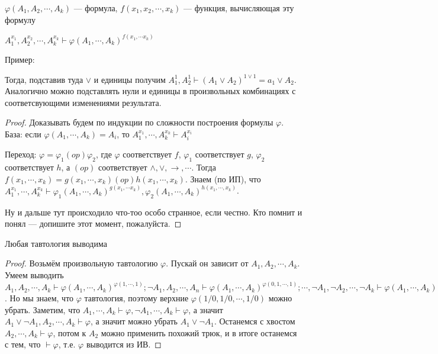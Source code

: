 \begin{lemma}
	$\varphi(A_1, A_2, \cdots, A_k)$ --- формула, $f(x_1, x_2, \cdots, x_k)$ --- функция, вычисляющая эту формулу

	$A_1^{x_1}, A_2^{x_2}, \cdots, A_k^{x_k} \vdash \varphi(A_1, \cdots, A_k)^{f(x_1, \cdots x_k)}$

	Пример:


	Тогда, подставив туда $\lor$ и единицы  получим $A_1^1, A_2^1 \vdash (A_1 \lor A_2)^{1 \lor 1} = a_1 \lor A_2$. Аналогично можно подставлять нули и единицы в произвольных комбинациях с соответсвующими изменениями результата.
\end{lemma}
\begin{proof}
	Доказывать будем по индукции по сложности построения формулы $\varphi$. База: если $\varphi(A_1, \cdots, A_k) = A_i$, то $A_1^{x_1}, \cdots, A_k^{x_k} \vdash A_i^{x_i}$

	Переход: $\varphi = \varphi_1 (op) \varphi_2$, где $\varphi$ соответствует $f$, $\varphi_1$ соответствует $g$, $\varphi_2$ соответствует $h$, а $(op)$  соответствует $\land, \lor, \to, \cdots$. Тогда $f(x_1, \cdots, x_k) = g(x_1, \cdots, x_k) (op) h(x_1, \cdots, x_k)$. Знаем (по ИП), что $A_1^{x_1}, \cdots, A_k^{x_k} \vdash \varphi_1(A_1, \cdots, A_k)^{g(x_1, \cdots x_k)}, \varphi_2(A_1, \cdots, A_k)^{h(x_1, \cdots, x_k)}$. 

	Ну и дальше тут происходило что-тоо особо странное, если честно. Кто помнит и понял --- допишите этот момент, пожалуйста.
\end{proof}

\begin{theorem}
	Любая тавтология выводима
\end{theorem}
\begin{proof}
	Возьмём произвольную тавтологию $\varphi$. Пускай он зависит от $A_1, A_2, \cdots, A_k$. Умеем выводить $A_1, A_2, \cdots, A_k \vdash \varphi(A_1, \cdots, A_k)^{\varphi(1, \cdots, 1)}; \lnot A_1, A_2, \cdots, A_n \vdash \varphi(A_1, \cdots, A_k)^{\varphi(0, 1, \cdots, 1)}; \cdots, \lnot A_1, \lnot A_2, \cdots, \lnot A_k \vdash \varphi(A_1, \cdots, A_k)$. Но мы знаем, что $\varphi$ тавтология, поэтому верхние $\varphi(1/0, 1/0, \cdots, 1/0)$ можно убрать. Заметим, что $A_1, \cdots, A_k \vdash \varphi, \lnot A_1, \cdots, A_k \vdash \varphi$, а значит $A_1 \lor \lnot A_1, A_2, \cdots, A_k \vdash \varphi$, а значит можно убрать $A_1 \lor \lnot A_1$. Останемся с хвостом $A_2, \cdots, A_k \vdash \varphi$, потом к $A_2$ можно применить похожий трюк, и в итоге останемся с тем, что $\vdash \varphi$, т.е. $\varphi$ выводится из ИВ. 
\end{proof}

